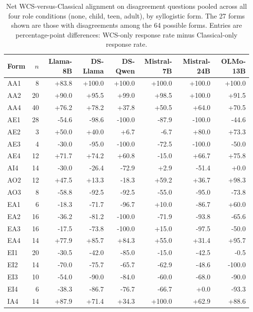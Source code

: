 \begin{table}[htbp]
\centering
\scriptsize
\setlength{\tabcolsep}{3pt}
\caption{Net WCS-versus-Classical alignment on disagreement questions pooled across all four role conditions (none, child, teen, adult), by syllogistic form. The 27 forms shown are those with disagreements among the 64 possible forms. Entries are percentage-point differences: WCS-only response rate minus Classical-only response rate.}
\label{tab:alignment-by-syllogistic-form-appendix}
\begin{tabular}{lrrrrrrr}
\toprule
Form & $n$ & Llama-8B & DS-Llama & DS-Qwen & Mistral-7B & Mistral-24B & OLMo-13B \\
\midrule
AA1 & 8 & +83.8 & +100.0 & +100.0 & +100.0 & +100.0 & +100.0 \\
AA2 & 20 & +90.0 & +95.5 & +99.0 & +98.5 & +100.0 & +91.5 \\
AA4 & 40 & +76.2 & +78.2 & +37.8 & +50.5 & +64.0 & +70.5 \\
AE1 & 28 & -54.6 & -98.6 & -100.0 & -87.9 & -100.0 & -44.6 \\
AE2 & 3 & +50.0 & +40.0 & +6.7 & -6.7 & +80.0 & +73.3 \\
AE3 & 4 & -30.0 & -95.0 & -100.0 & -72.5 & -100.0 & -50.0 \\
AE4 & 12 & +71.7 & +74.2 & +60.8 & -15.0 & +66.7 & +75.8 \\
AI4 & 14 & -30.0 & -26.4 & -72.9 & +2.9 & -51.4 & +0.0 \\
AO2 & 12 & +47.5 & +13.3 & -18.3 & +59.2 & +36.7 & +98.3 \\
AO3 & 8 & -58.8 & -92.5 & -92.5 & -55.0 & -95.0 & -73.8 \\
EA1 & 6 & -18.3 & -71.7 & -96.7 & +10.0 & -86.7 & +60.0 \\
EA2 & 16 & -36.2 & -81.2 & -100.0 & -71.9 & -93.8 & -65.6 \\
EA3 & 16 & -17.5 & -73.8 & -100.0 & +15.0 & -97.5 & -50.0 \\
EA4 & 14 & +77.9 & +85.7 & +84.3 & +55.0 & +31.4 & +95.7 \\
EI1 & 20 & -30.5 & -42.0 & -85.0 & -15.0 & -42.5 & -0.5 \\
EI2 & 14 & -70.0 & -75.7 & -65.7 & -62.9 & -48.6 & -100.0 \\
EI3 & 10 & -54.0 & -90.0 & -84.0 & -60.0 & -68.0 & -90.0 \\
EI4 & 6 & -38.3 & -86.7 & -76.7 & -66.7 & +0.0 & -93.3 \\
IA4 & 14 & +87.9 & +71.4 & +34.3 & +100.0 & +62.9 & +88.6 \\

\end{tabular}
\end{table}
